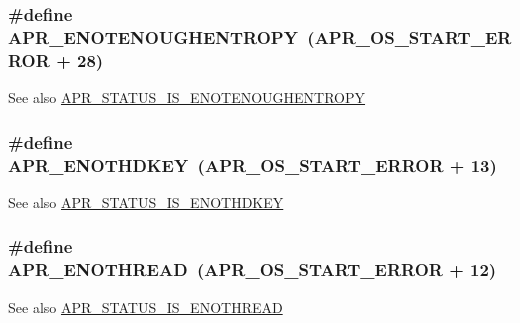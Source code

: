 \subsubsection[{\texorpdfstring{A\+P\+R\+\_\+\+E\+N\+O\+T\+E\+N\+O\+U\+G\+H\+E\+N\+T\+R\+O\+PY}{APR_ENOTENOUGHENTROPY}}]{\setlength{\rightskip}{0pt plus 5cm}\#define A\+P\+R\+\_\+\+E\+N\+O\+T\+E\+N\+O\+U\+G\+H\+E\+N\+T\+R\+O\+PY~({\bf A\+P\+R\+\_\+\+O\+S\+\_\+\+S\+T\+A\+R\+T\+\_\+\+E\+R\+R\+OR} + 28)}\hypertarget{group__APR__Error_gaaee9e4e763844197e3750bb66ff75cd0}{}\label{group__APR__Error_gaaee9e4e763844197e3750bb66ff75cd0}
\begin{DoxySeeAlso}{See also}
\hyperlink{group__APR__STATUS__IS_gab8b0af2df80bfb9edfc8dbcbb6bdf925}{A\+P\+R\+\_\+\+S\+T\+A\+T\+U\+S\+\_\+\+I\+S\+\_\+\+E\+N\+O\+T\+E\+N\+O\+U\+G\+H\+E\+N\+T\+R\+O\+PY} 
\end{DoxySeeAlso}
\subsubsection[{\texorpdfstring{A\+P\+R\+\_\+\+E\+N\+O\+T\+H\+D\+K\+EY}{APR_ENOTHDKEY}}]{\setlength{\rightskip}{0pt plus 5cm}\#define A\+P\+R\+\_\+\+E\+N\+O\+T\+H\+D\+K\+EY~({\bf A\+P\+R\+\_\+\+O\+S\+\_\+\+S\+T\+A\+R\+T\+\_\+\+E\+R\+R\+OR} + 13)}\hypertarget{group__APR__Error_ga29faf801fac647a14360e7493f7fd74e}{}\label{group__APR__Error_ga29faf801fac647a14360e7493f7fd74e}
\begin{DoxySeeAlso}{See also}
\hyperlink{group__APR__STATUS__IS_ga782b37d892214ee60911062791871ae2}{A\+P\+R\+\_\+\+S\+T\+A\+T\+U\+S\+\_\+\+I\+S\+\_\+\+E\+N\+O\+T\+H\+D\+K\+EY} 
\end{DoxySeeAlso}
\subsubsection[{\texorpdfstring{A\+P\+R\+\_\+\+E\+N\+O\+T\+H\+R\+E\+AD}{APR_ENOTHREAD}}]{\setlength{\rightskip}{0pt plus 5cm}\#define A\+P\+R\+\_\+\+E\+N\+O\+T\+H\+R\+E\+AD~({\bf A\+P\+R\+\_\+\+O\+S\+\_\+\+S\+T\+A\+R\+T\+\_\+\+E\+R\+R\+OR} + 12)}\hypertarget{group__APR__Error_ga7b43e1e075ff031e142aa809295ee441}{}\label{group__APR__Error_ga7b43e1e075ff031e142aa809295ee441}
\begin{DoxySeeAlso}{See also}
\hyperlink{group__APR__STATUS__IS_gaf33e51e4df639e2b93c99a2fa8b5c7e7}{A\+P\+R\+\_\+\+S\+T\+A\+T\+U\+S\+\_\+\+I\+S\+\_\+\+E\+N\+O\+T\+H\+R\+E\+AD} 
\end{DoxySeeAlso}
